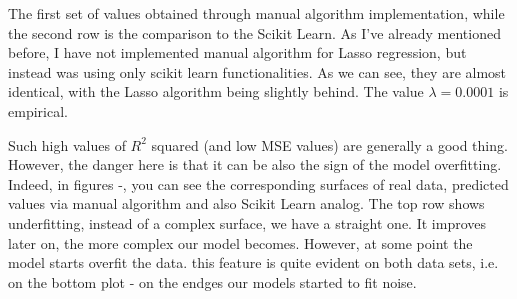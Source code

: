  The first set of values obtained through manual algorithm implementation, while the second row is the comparison to the Scikit Learn. As I've already mentioned before, I have not implemented manual algorithm for Lasso regression, but instead was using only scikit learn functionalities. As we can see, they are almost identical, with the Lasso algorithm being slightly behind. The value $\lambda=0.0001$ is empirical.
 
 Such high values of $R^2$ squared (and low MSE values) are generally a good thing. However, the danger here is that it can be also the sign of the model overfitting. Indeed, in figures \rf{}-\rf{}, you can see the corresponding surfaces of real data, predicted values via manual algorithm and also Scikit Learn analog. The top row shows underfitting, instead of a complex surface, we have a straight one. It improves later on, the more complex our model becomes. However, at some point the model starts overfit the data. this feature is quite evident on both data sets, i.e. on the bottom plot - on the endges our models started to fit noise. 
